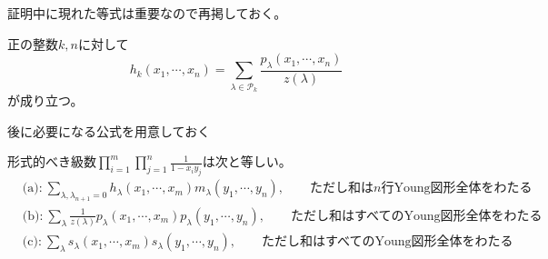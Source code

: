 \documentclass{ltjsreport}
\begin{document}
証明中に現れた等式は重要なので再掲しておく。

\begin{prop}\label{p_to_h}
  正の整数$k,n$に対して
  \[
    h_k(x_1,\cdots,x_n)=\sum_{\lambda\in\mathcal{P}_{k}}\frac{p_\lambda(x_1,\cdots,x_n)}{z(\lambda)}
  \]
  が成り立つ。
\end{prop}

後に必要になる公式を用意しておく


\begin{lemm}[Cauchyの等式]\label{formal_power_series_relation}
  形式的べき級数$\prod_{i=1}^m\prod_{j=1}^n\frac{1}{1-x_iy_j}$は次と等しい。
  \begin{align*}
    &\text{(a):}\:\sum_{\lambda,\lambda_{n+1}=0}h_\lambda(x_1,\cdots,x_m)m_\lambda(y_1,\cdots,y_n),\qquad \text{ただし和は$n$行Young図形全体をわたる}\\
    &\text{(b):}\:\sum_{\lambda}\frac{1}{z(\lambda)}p_\lambda(x_1,\cdots,x_m)p_\lambda(y_1,\cdots,y_n),\qquad \text{ただし和はすべてのYoung図形全体をわたる}\\
    &\text{(c):}\:\sum_{\lambda}s_\lambda(x_1,\cdots,x_m)s_\lambda(y_1,\cdots,y_n),\qquad \text{ただし和はすべてのYoung図形全体をわたる}
  \end{align*}
\end{lemm}
\end{document}
